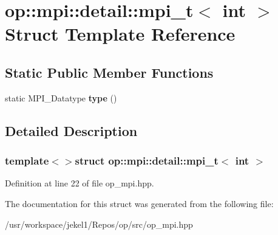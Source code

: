 \hypertarget{structop_1_1mpi_1_1detail_1_1mpi__t_3_01int_01_4}{\section{op\-:\-:mpi\-:\-:detail\-:\-:mpi\-\_\-t$<$ int $>$ Struct Template Reference}
\label{structop_1_1mpi_1_1detail_1_1mpi__t_3_01int_01_4}
}
\subsection*{Static Public Member Functions}
\begin{DoxyCompactItemize}
\item 
\hypertarget{structop_1_1mpi_1_1detail_1_1mpi__t_3_01int_01_4_a76ea4ea9645edf67e08c164c92831b52}{static M\-P\-I\-\_\-\-Datatype {\bfseries type} ()}\label{structop_1_1mpi_1_1detail_1_1mpi__t_3_01int_01_4_a76ea4ea9645edf67e08c164c92831b52}

\end{DoxyCompactItemize}


\subsection{Detailed Description}
\subsubsection*{template$<$$>$struct op\-::mpi\-::detail\-::mpi\-\_\-t$<$ int $>$}



Definition at line 22 of file op\-\_\-mpi.\-hpp.



The documentation for this struct was generated from the following file\-:\begin{DoxyCompactItemize}
\item 
/usr/workspace/jekel1/\-Repos/op/src/op\-\_\-mpi.\-hpp\end{DoxyCompactItemize}
